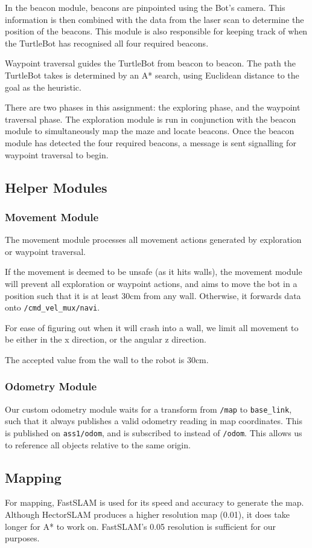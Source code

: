 \documentclass[titlepage,12pt,a4paper]{article}
\begin{document}
In the beacon module, beacons are pinpointed using the Bot's camera. This information is then combined with the data from the laser scan to determine the position of the beacons. This module is also responsible for keeping track of when the TurtleBot has recognised all four required beacons. 

Waypoint traversal guides the TurtleBot from beacon to beacon. The path the TurtleBot takes is determined by an A* search, using Euclidean distance to the goal as the heuristic. 

There are two phases in this assignment: the exploring phase, and the waypoint traversal phase. The exploration module is run in conjunction with the beacon module to simultaneously map the maze and locate beacons. Once the beacon module has detected the four required beacons, a message is sent signalling for waypoint traversal to begin. 

\subsection{Helper Modules}
\subsubsection{Movement Module}
The movement module processes all movement actions generated by exploration or waypoint traversal. 

If the movement is deemed to be unsafe (as it hits walls), the movement module will prevent all exploration or waypoint actions, and aims to move the bot in a position such that it is at least 30cm from any wall. Otherwise, it forwards data onto \verb|/cmd_vel_mux/navi|. 

For ease of figuring out when it will crash into a wall, we limit all movement to be either in the x direction, or the angular z direction.

The accepted value from the wall to the robot is 30cm.

\subsubsection{Odometry Module}
Our custom odometry module waits for a transform from \verb|/map| to \verb|base_link|, such that it always publishes a valid odometry reading in map coordinates. This is published on \verb|ass1/odom|, and is subscribed to instead of \verb|/odom|. This allows us to reference all objects relative to the same origin.

\subsection{Mapping}
For mapping, FastSLAM is used for its speed and accuracy to generate the map. Although HectorSLAM produces a higher resolution map (0.01), it does take longer for A* to work on. FastSLAM's 0.05 resolution is sufficient for our purposes.
\end{document}
